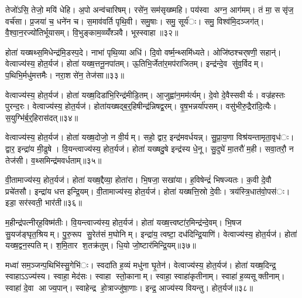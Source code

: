 तेजो॑ऽसि॒ तेजो॒ मयि॑ धेहि। अ॒पो अन्व॑चारिषम्। रसे॑न॒ सम॑सृख्ष्महि। पय॑स्वा अग्न॒ आग॑मम्। तं मा॒ ससृ॑ज॒ वर्च॑सा। प्र॒जया॑ च॒ धने॑न च। स॒माव॑वर्ति पृथि॒वी। समु॒षाः। समु॒ सूर्य॑ः। समु॒ विश्व॑मि॒दञ्जग॑त्। वै॒श्वा॒न॒रज्यो॑तिर्भूयासम्। वि॒भुङ्काम॒व्व्यँ॑श्ञवै। भूस्स्वाहा॥३२॥


होता॑ यख्षथ्स॒मिधेन्द्र॑मि॒डस्प॒दे। नाभा॑ पृथि॒व्या अधि॑। दि॒वो वर्ष्म॒न्थ्समि॑ध्यते। ओजि॑ष्ठश्चर्‌षणी॒ सहान्॑। वेत्वाज्य॑स्य॒ होत॒र्यज॑। होता॑ यख्ष॒त्तनू॒नपा॑तम्। ऊ॒तिभि॒र्जेता॑र॒मप॑राजितम्। इन्द्र॑न्दे॒व सु॑व॒र्विदम्। प॒थिभि॒र्मधु॑मत्तमैः। नरा॒शसे॑न॒ तेज॑सा॥३३॥

वेत्वाज्य॑स्य॒ होत॒र्यज॑। होता॑ यख्ष॒दिडा॑भि॒रिन्द्र॑मीडि॒तम्। आ॒जुह्वा॑न॒मम॑र्त्यम्। दे॒वो दे॒वैस्सवीर्यः। वज्र॑हस्तः पुरन्द॒रः। वेत्वाज्य॑स्य॒ होत॒र्यज॑। होता॑यख्षद्ब॒र्॒हिषीन्द्र॑न्निषद्व॒रम्। वृ॒ष॒भन्नर्या॑पसम्। वसु॑भीरु॒द्रैरा॑दि॒त्यैः। स॒युग्भि॑र्ब॒र्॒हिरास॑दत्॥३४॥

वेत्वाज्य॑स्य॒ होत॒र्यज॑। होता॑ यख्ष॒दोजो॒ न वी॒र्यम्। सहो॒ द्वार॒ इन्द्र॑मवर्धयन्न्। सु॒प्रा॒य॒णा विश्र॑यन्तामृता॒वृध॑ः। द्वार॒ इन्द्रा॑य मी॒ढुषे। वि॒यन्त्वाज्य॑स्य॒ होत॒र्यज॑। होता॑ यख्षदु॒षे इन्द्र॑स्य धे॒नू। सु॒दुघे॑ मा॒तरौ॑ म॒ही। सवा॒तरौ॒ न तेज॑सी। व॒थ्समिन्द्र॑मवर्धताम्॥३५॥

वी॒तामाज्य॑स्य॒ होत॒र्यज॑। होता॑ यख्ष॒द्दैव्या॒ होता॑रा। भि॒षजा॒ सखा॑या। ह॒विषेन्द्रं॑ भिषज्यतः। क॒वी दे॒वौ प्रचे॑तसौ। इन्द्रा॑य धत्त इन्द्रि॒यम्। वी॒तामाज्य॑स्य॒ होत॒र्यज॑। होता॑ यख्षत्ति॒स्रो दे॒वीः। त्रय॑स्त्रि॒धात॑वो॒पस॑ः। इडा॒ सर॑स्वती॒ भार॑ती॥३६॥

म॒हीन्द्र॑पत्नीर्‌ह॒विष्म॑तीः। वि॒यन्त्वाज्य॑स्य॒ होत॒र्यज॑। होता॑ यख्ष॒त्त्वष्टा॑र॒मिन्द्र॑न्दे॒वम्। भि॒षज सु॒यज॑ङ्घृत॒श्रियम्। पु॒रु॒रूप सु॒रेत॑सं म॒घोनिम्। इन्द्रा॑य॒ त्वष्टा॒ दध॑दिन्द्रि॒याणि॑। वेत्वाज्य॑स्य॒ होत॒र्यज॑। होता॑ यख्ष॒द्वन॒स्पतिम्। श॒मि॒तार श॒तक्र॑तुम्। धि॒यो जो॒ष्टार॑मिन्द्रि॒यम्॥३७॥

मध्वा॑ सम॒ञ्जन्प॒थिभि॑स्सु॒गेभि॑ः। स्वदा॑ति ह॒व्यं मधु॑ना घृ॒तेन॑। वेत्वाज्य॑स्य॒ होत॒र्यज॑। होता॑ यख्ष॒दिन्द्र॒ स्वाहाऽऽज्य॑स्य। स्वाहा॒ मेद॑सः। स्वाहा स्तो॒कानाम्। स्वाहा॒ स्वाहा॑कृतीनाम्। स्वाहा॑ ह॒व्यसूक्तीनाम्। स्वाहा॑ दे॒वा आज्य॒पान्। स्वाहेन्द्र हो॒त्राज्जु॑षा॒णाः। इन्द्र॒ आज्य॑स्य वियन्तु। होत॒र्यज॑॥३८॥

